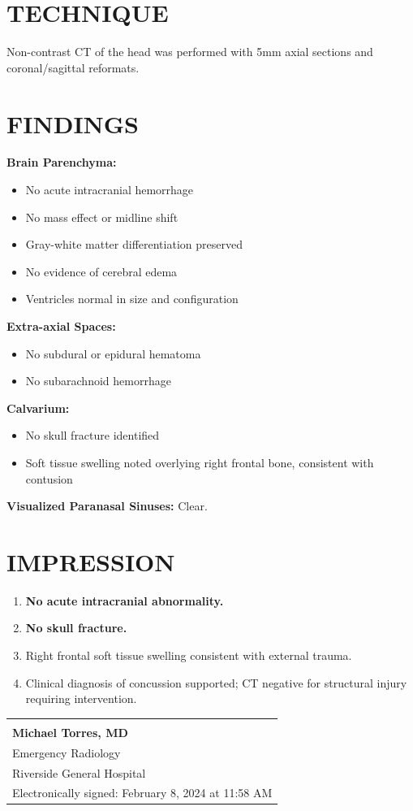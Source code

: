 \documentclass[11pt]{article}
\begin{document}
\section*{TECHNIQUE}

Non-contrast CT of the head was performed with 5mm axial sections and coronal/sagittal reformats.

\section*{FINDINGS}

\textbf{Brain Parenchyma:}
\begin{itemize}[nosep]
\item No acute intracranial hemorrhage
\item No mass effect or midline shift
\item Gray-white matter differentiation preserved
\item No evidence of cerebral edema
\item Ventricles normal in size and configuration
\end{itemize}

\textbf{Extra-axial Spaces:}
\begin{itemize}[nosep]
\item No subdural or epidural hematoma
\item No subarachnoid hemorrhage
\end{itemize}

\textbf{Calvarium:}
\begin{itemize}[nosep]
\item No skull fracture identified
\item Soft tissue swelling noted overlying right frontal bone, consistent with contusion
\end{itemize}

\textbf{Visualized Paranasal Sinuses:} Clear.

\section*{IMPRESSION}

\begin{enumerate}
\item \textbf{No acute intracranial abnormality.}
\item \textbf{No skull fracture.}
\item Right frontal soft tissue swelling consistent with external trauma.
\item Clinical diagnosis of concussion supported; CT negative for structural injury requiring intervention.
\end{enumerate}

\vspace{2em}

\begin{tabular}{@{}p{10cm}@{}}
\hrulefill \\
\textbf{Michael Torres, MD} \\
Emergency Radiology \\
Riverside General Hospital \\
Electronically signed: February 8, 2024 at 11:58 AM \\
\end{tabular}
\end{document}
